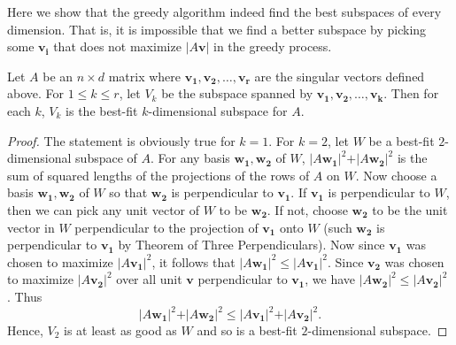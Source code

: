 Here we show that the greedy algorithm indeed find the best subspaces of every dimension. That is, it is impossible that we find a better subspace by picking some \(\mathbf{v_i} \) that does not maximize \(\vert A \mathbf{v}  \vert \) in the greedy process.  

\begin{theorem}\label{thm: greedy best-fit}
    Let \(A\) be an \(n \times d\) matrix where \(\mathbf{v_1}, \mathbf{v_2}, \dots , \mathbf{v_r}\) are the singular vectors defined above. For \(1 \le k \le r\), let \(V_k\) be the subspace spanned by \(\mathbf{v_1}, \mathbf{v_2}, \dots , \mathbf{v_k}\). Then for each \(k\), \(V_k\) is the best-fit \(k\)-dimensional subspace for \(A\).          
\end{theorem}
\begin{proof}
    The statement is obviously true for \(k=1\). For \(k=2\), let \(W\) be a best-fit \(2\)-dimensional subspace of \(A\). For any basis \(\mathbf{w_1}, \mathbf{w_2}  \)   of \(W\), \(\vert A \mathbf{w_1}  \vert^2 + \vert A \mathbf{w_2}  \vert^2  \) is the sum of squared lengths of the projections of the rows of \(A\) on \(W\).  Now choose a basis \(\mathbf{w_1}, \mathbf{w_2}  \) of \(W\) so that \(\mathbf{w_2} \) is perpendicular to \(\mathbf{v_1} \). If \(\mathbf{v_1} \) is perpendicular to \(W\), then we can pick any unit vector of \(W\) to be \(\mathbf{w_2} \). If not, choose \(\mathbf{w_2} \) to be the unit vector in \(W\) perpendicular to the projection of \(\mathbf{v_1} \) onto \(W\) (such \(\mathbf{w_2} \) is perpendicular to \(\mathbf{v_1} \) by Theorem of Three Perpendiculars). Now since \(\mathbf{v_1} \) was chosen to maximize \(\vert A \mathbf{v_1}  \vert^2 \), it follows that \(\vert A \mathbf{w_1}  \vert^2 \le \vert A \mathbf{v_1}  \vert^2  \). Since \(\mathbf{v_2} \) was chosen to maximize \(\vert A \mathbf{v_2}  \vert^2 \) over all unit \(\mathbf{v} \) perpendicular to \(\mathbf{v_1} \), we have \(\vert A \mathbf{w_2}  \vert^2 \le \vert A \mathbf{v_2}  \vert^2  \) . Thus
    \[
      \vert A \mathbf{w_1}  \vert^2 + \vert A \mathbf{w_2}  \vert^2 \le \vert A \mathbf{v_1}  \vert^2 + \vert A \mathbf{v_2}  \vert^2.  
    \]   
    Hence, \(V_2\) is at least as good as \(W\) and so is a best-fit \(2\)-dimensional subspace.  


\end{proof}
